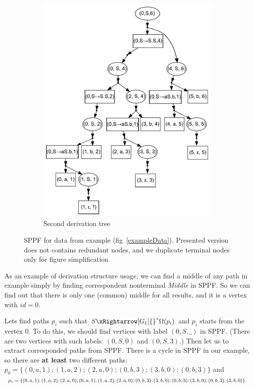 \begin{figure}[ht]
\begin{center}
\begin{subfigure}[b]{0.3\textwidth}
        \includegraphics[width=\textwidth]{dot/Brackets2.pdf}
        \caption{Second derivation tree}
        \label{tree2}        
    \end{subfigure}
    \caption{SPPF for data from example (fig~\ref{exampleData}). Presented version does not contains redundant nodes, and we duplicate terminal nodes only for figure simplification}
    \label{sppfSample}
    \end{center}                
\end{figure}

As an example of derivation structure usage, we can find a middle of any path in example simply by finding correspondent nonterminal \textit{Middle} in SPPF.
So we can find out that there is only one (common) middle for all results, and it is a vertex with $id = 0$.

Lets find paths $p_i$ such that $S {\xRightarrow[G_1]{}}^{*} \Omega(p_i)$ and $p_i$ starts from the vertex $0$.
To do this, we should find vertices with label $(0, S, \_)$ in SPPF.
(There are two vertices with such labels: $(0, S, 0)$ and $(0, S, 3)$.)
Then let us to extract corresponded paths from SPPF.
There is a cycle in SPPF in our example, so there are \textbf{at least} two different paths: $p_0=\{(0,a,1);(1,a,2);(2,a,0);(0,b,3);(3,b,0);(0,b,3)\}$ and 
$
p_1=\{(0,a,1);(1,a,2);(2,a,0);(0,a,1);(1,a,2);(2,a,0);(0,b,3);(3,b,0);(0,b,3);\\(3,b,0);(0,b,3);(3,b,0)\}.
$

